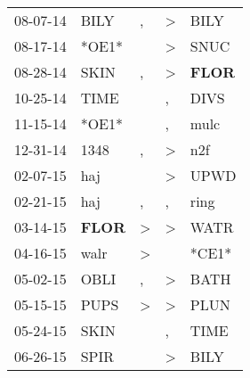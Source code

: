 \begin{supertabular}{p{0.07\textwidth}p{0.06\textwidth}p{0.02\textwidth}p{0.02\textwidth}p{0.06\textwidth}}
          08-07-14\textsuperscript{} &           BILY\textsuperscript{} &                , &     \textgreater &           BILY\textsuperscript{} \\
          08-17-14\textsuperscript{} &                            *OE1* &                  &     \textgreater &           SNUC\textsuperscript{} \\
          08-28-14\textsuperscript{} &           SKIN\textsuperscript{} &                , &     \textgreater &  \textbf{FLOR\textsuperscript{}} \\
          10-25-14\textsuperscript{} &           TIME\textsuperscript{} &                  &                , &           DIVS\textsuperscript{} \\
          11-15-14\textsuperscript{} &                            *OE1* &                  &                , &           mulc\textsuperscript{} \\
          12-31-14\textsuperscript{} &           1348\textsuperscript{} &                , &     \textgreater &            n2f\textsuperscript{} \\
          02-07-15\textsuperscript{} &            haj\textsuperscript{} &                  &     \textgreater &           UPWD\textsuperscript{} \\
          02-21-15\textsuperscript{} &            haj\textsuperscript{} &                , &                , &           ring\textsuperscript{} \\
          03-14-15\textsuperscript{} &  \textbf{FLOR\textsuperscript{}} &     \textgreater &     \textgreater &           WATR\textsuperscript{} \\
          04-16-15\textsuperscript{} &           walr\textsuperscript{} &     \textgreater &                  &                            *CE1* \\
          05-02-15\textsuperscript{} &           OBLI\textsuperscript{} &                , &     \textgreater &           BATH\textsuperscript{} \\
          05-15-15\textsuperscript{} &           PUPS\textsuperscript{} &     \textgreater &     \textgreater &           PLUN\textsuperscript{} \\
          05-24-15\textsuperscript{} &           SKIN\textsuperscript{} &                  &                , &           TIME\textsuperscript{} \\
          06-26-15\textsuperscript{} &           SPIR\textsuperscript{} &                  &     \textgreater &           BILY\textsuperscript{} \\

\end{supertabular}
